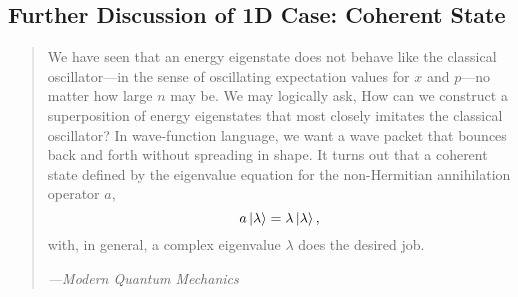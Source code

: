 \documentclass{article}
\theoremstyle{1}
\begin{document}
\subsection{Further Discussion of 1D Case: Coherent State}
\begin{quotation}
    We have seen that an energy eigenstate does not behave like the classical
oscillator—in the sense of oscillating expectation values for $x$ and $p$—no matter
how large $n$ may be. We may logically ask, How can we construct a superposition
of energy eigenstates that most closely imitates the classical oscillator? In wave-function language, we want a wave packet that bounces back and forth without
spreading in shape. It turns out that a coherent state defined by the eigenvalue
equation for the non-Hermitian annihilation operator $a$,
$$a\ket{\lambda}=\lambda\ket{\lambda},$$
with, in general, a complex eigenvalue $\lambda$ does the desired job. 
\begin{flushright}
    {\raggedleft \textit{---Modern Quantum Mechanics}}
\end{flushright}
\end{quotation}
\end{document}
